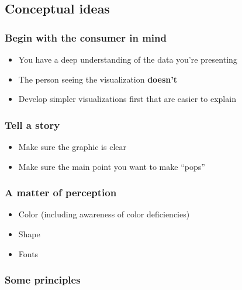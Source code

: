 \documentclass[
  letterpaper,
]{scrbook}
\providecommand{\tightlist}{%
  \setlength{\itemsep}{0pt}\setlength{\parskip}{0pt}}
\begin{document}
\hypertarget{conceptual-ideas}{%
\subsection{Conceptual ideas}\label{conceptual-ideas}}

\hypertarget{begin-with-the-consumer-in-mind}{%
\subsubsection{Begin with the consumer in mind}\label{begin-with-the-consumer-in-mind}}

\begin{itemize}
\tightlist
\item
  You have a deep understanding of the data you're presenting
\item
  The person seeing the visualization \textbf{doesn't}
\item
  Develop simpler visualizations first that are easier to explain
\end{itemize}

\hypertarget{tell-a-story}{%
\subsubsection{Tell a story}\label{tell-a-story}}

\begin{itemize}
\tightlist
\item
  Make sure the graphic is clear
\item
  Make sure the main point you want to make ``pops''
\end{itemize}

\hypertarget{a-matter-of-perception}{%
\subsubsection{A matter of perception}\label{a-matter-of-perception}}

\begin{itemize}
\tightlist
\item
  Color (including awareness of color deficiencies)
\item
  Shape
\item
  Fonts
\end{itemize}

\hypertarget{some-principles}{%
\subsubsection{Some principles}\label{some-principles}}
\end{document}
